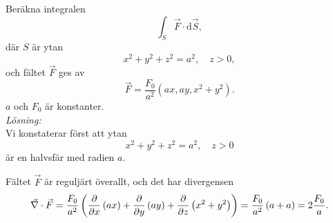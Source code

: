 \documentclass[%
oneside,                 %
final,                   %
10pt]{article}
\newenvironment{notice_mdfboxadmon}[1][]{
\begin{notice_mdfboxmdframed}[frametitle=#1]
}
{
\end{notice_mdfboxmdframed}
}
\begin{document}
\begin{notice_mdfboxadmon}

Beräkna integralen
\begin{equation}
  \int_S \vec{F}\cdot \mbox{d}\vec{S},
\end{equation}
där $S$ är ytan
\begin{equation}
  x^2 + y^2 + z^2 = a^2,  \quad z> 0,
\end{equation}
och fältet $\vec{F}$ ges av
\begin{equation}
  \vec{F} = \frac{F_0}{a^2} \left(ax, ay, x^2+y^2\right).
\end{equation}
$a$ och $F_0$ är konstanter.\\

\emph{Lösning:} \\
Vi konstaterar först att ytan
\begin{equation}
  x^2 + y^2 + z^2 = a^2, \quad z>0
\end{equation}
är en halvsfär med radien $a$.  

Fältet $\vec{F}$ är reguljärt överallt, och det har divergensen
\begin{equation}
  \vec{\nabla} \cdot \vec{F} = \frac{F_0}{a^2}\left(\frac{\partial}{\partial x}
\left(ax\right) + \frac{\partial}{\partial y} \left(ay\right) +
\frac{\partial}{\partial z} \left(x^2 + y^2\right)\right) = \frac{F_0}{a^2}
\left(a+a\right) = 2 \frac{F_0}{a}.
\end{equation}


\end{notice_mdfboxadmon}
\end{document}
